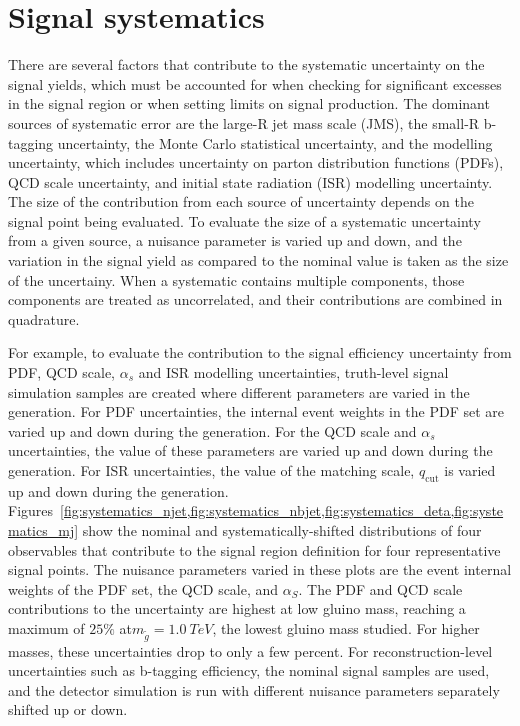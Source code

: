 \chapter{Signal systematics}\label{ch:signal_systematics}
There are several factors that contribute to the systematic uncertainty on the signal yields, which must be accounted for when checking for significant excesses in the signal region or when setting limits on signal production.
The dominant sources of systematic error are the large-R jet mass scale (JMS), the small-R b-tagging uncertainty, the Monte Carlo statistical uncertainty, and the modelling uncertainty, which includes uncertainty on parton distribution functions (PDFs), QCD scale uncertainty, and initial state radiation (ISR) modelling uncertainty.
The size of the contribution from each source of uncertainty depends on the signal point being evaluated.
To evaluate the size of a systematic uncertainty from a given source, a nuisance parameter is varied up and down, and the variation in the signal yield as compared to the nominal value is taken as the size of the uncertainy.
When a systematic contains multiple components, those components are treated as uncorrelated, and their contributions are combined in quadrature.

For example, to evaluate the contribution to the signal efficiency uncertainty from PDF, QCD scale, $\alpha_s$ and ISR modelling uncertainties, truth-level signal simulation samples are created where different parameters are varied in the generation.
For PDF uncertainties, the internal event weights in the PDF set are varied up and down during the generation.
For the QCD scale and $\alpha_{s}$ uncertainties, the value of these parameters are varied up and down during the generation.
For ISR uncertainties, the value of the matching scale, $q_{\textrm{cut}}$ is varied up and down during the generation.
Figures~\ref{fig:systematics_njet,fig:systematics_nbjet,fig:systematics_deta,fig:systematics_mj} show the nominal and systematically-shifted distributions of four observables that contribute to the signal region definition for four representative signal points.
The nuisance parameters varied in these plots are the event internal weights of the PDF set, the QCD scale, and $\alpha_{S}$.
The PDF and QCD scale contributions to the uncertainty are highest at low gluino mass, reaching a maximum of $25\%$ at$m_{\tilde{g}}=1.0~TeV$, the lowest gluino mass studied.
For higher masses, these uncertainties drop to only a few percent.
For reconstruction-level uncertainties such as b-tagging efficiency, the nominal signal samples are used, and the detector simulation is run with different nuisance parameters separately shifted up or down.

